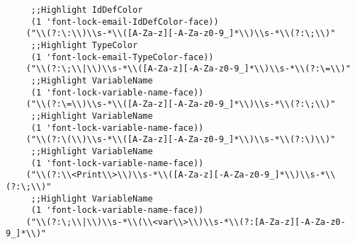 \documentclass[]{article}
\begin{document}
\begin{lstlisting}
     ;;Highlight IdDefColor
     (1 'font-lock-email-IdDefColor-face))
    ("\\(?:\:\\)\\s-*\\([A-Za-z][-A-Za-z0-9_]*\\)\\s-*\\(?:\;\\)"
     ;;Highlight TypeColor
     (1 'font-lock-email-TypeColor-face))
    ("\\(?:\;\\|\\)\\s-*\\([A-Za-z][-A-Za-z0-9_]*\\)\\s-*\\(?:\=\\)"
     ;;Highlight VariableName
     (1 'font-lock-variable-name-face))
    ("\\(?:\=\\)\\s-*\\([A-Za-z][-A-Za-z0-9_]*\\)\\s-*\\(?:\;\\)"
     ;;Highlight VariableName
     (1 'font-lock-variable-name-face))
    ("\\(?:\(\\)\\s-*\\([A-Za-z][-A-Za-z0-9_]*\\)\\s-*\\(?:\)\\)"
     ;;Highlight VariableName
     (1 'font-lock-variable-name-face))
    ("\\(?:\\<Print\\>\\)\\s-*\\([A-Za-z][-A-Za-z0-9_]*\\)\\s-*\\(?:\;\\)"
     ;;Highlight VariableName
     (1 'font-lock-variable-name-face))
    ("\\(?:\;\\|\\)\\s-*\\(\\<var\\>\\)\\s-*\\(?:[A-Za-z][-A-Za-z0-9_]*\\)"

\end{lstlisting}
\end{document}
